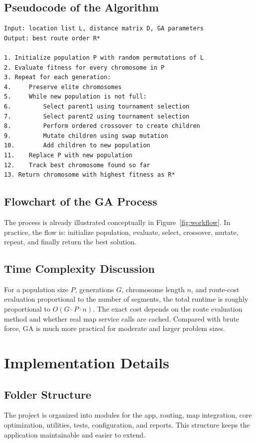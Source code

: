 \subsection{Pseudocode of the Algorithm}
\begin{verbatim}
Input: location list L, distance matrix D, GA parameters
Output: best route order R*

1. Initialize population P with random permutations of L
2. Evaluate fitness for every chromosome in P
3. Repeat for each generation:
4.     Preserve elite chromosomes
5.     While new population is not full:
6.         Select parent1 using tournament selection
7.         Select parent2 using tournament selection
8.         Perform ordered crossover to create children
9.         Mutate children using swap mutation
10.        Add children to new population
11.    Replace P with new population
12.    Track best chromosome found so far
13. Return chromosome with highest fitness as R*
\end{verbatim}

\subsection{Flowchart of the GA Process}
The process is already illustrated conceptually in Figure~\ref{fig:workflow}. In practice, the flow is: initialize population, evaluate, select, crossover, mutate, repeat, and finally return the best solution.

\subsection{Time Complexity Discussion}
For a population size $P$, generations $G$, chromosome length $n$, and route-cost evaluation proportional to the number of segments, the total runtime is roughly proportional to $O(G \cdot P \cdot n)$. The exact cost depends on the route evaluation method and whether real map service calls are cached. Compared with brute force, GA is much more practical for moderate and larger problem sizes.

\section{Implementation Details}
\subsection{Folder Structure}
The project is organized into modules for the app, routing, map integration, core optimization, utilities, tests, configuration, and reports. This structure keeps the application maintainable and easier to extend.


